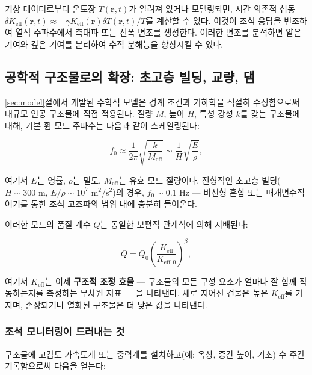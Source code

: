 \documentclass[12pt,a4paper]{article}
\theoremstyle{remark}
\newcommand{\Keff}{K_{\mathrm{eff}}}
\begin{document}
	기상 데이터로부터 온도장 \(T(\mathbf{r},t)\)가 알려져 있거나 모델링되면, 시간 의존적 섭동 \(\delta \Keff(\mathbf{r},t) \approx -\gamma \Keff(\mathbf{r}) \delta T(\mathbf{r},t)/T\)를 계산할 수 있다. 이것이 조석 응답을 변조하여 열적 주파수에서 측대파 또는 진폭 변조를 생성한다. 이러한 변조를 분석하면 얕은 기여와 깊은 기여를 분리하여 수직 분해능을 향상시킬 수 있다.
	
	\subsection{공학적 구조물로의 확장: 초고층 빌딩, 교량, 댐}
	\label{sec:structures}
	
	\ref{sec:model}절에서 개발된 수학적 모델은 경계 조건과 기하학을 적절히 수정함으로써 대규모 인공 구조물에 직접 적용된다. 질량 \(M\), 높이 \(H\), 특성 강성 \(k\)를 갖는 구조물에 대해, 기본 휨 모드 주파수는 다음과 같이 스케일링된다:
	
	\begin{equation}
		f_0 \approx \frac{1}{2\pi} \sqrt{\frac{k}{M_{\mathrm{eff}}}} \sim \frac{1}{H} \sqrt{\frac{E}{\rho}},
		\label{eq:structural-frequency}
	\end{equation}
	
	여기서 \(E\)는 영률, \(\rho\)는 밀도, \(M_{\mathrm{eff}}\)는 유효 모드 질량이다. 전형적인 초고층 빌딩(\(H \sim 300\) m, \(E/\rho \sim 10^7\) m\(^2\)/s\(^2\))의 경우, \(f_0 \sim 0.1\) Hz — 비선형 혼합 또는 매개변수적 여기를 통한 조석 고조파의 범위 내에 충분히 들어온다.
	
	이러한 모드의 품질 계수 \(Q\)는 동일한 보편적 관계식에 의해 지배된다:
	
	\begin{equation}
		Q = Q_0 \left( \frac{K_{\mathrm{eff}}}{K_{\mathrm{eff},0}} \right)^{\beta},
		\label{eq:structural-Q}
	\end{equation}
	
	여기서 \(K_{\mathrm{eff}}\)는 이제 \textbf{구조적 조정 효율} — 구조물의 모든 구성 요소가 얼마나 잘 함께 작동하는지를 측정하는 무차원 지표 — 을 나타낸다. 새로 지어진 건물은 높은 \(K_{\mathrm{eff}}\)를 가지며, 손상되거나 열화된 구조물은 더 낮은 값을 나타낸다.
	
	\subsubsection{조석 모니터링이 드러내는 것}
	
	구조물에 고감도 가속도계 또는 중력계를 설치하고(예: 옥상, 중간 높이, 기초) 수 주간 기록함으로써 다음을 얻는다:
	
\end{document}
